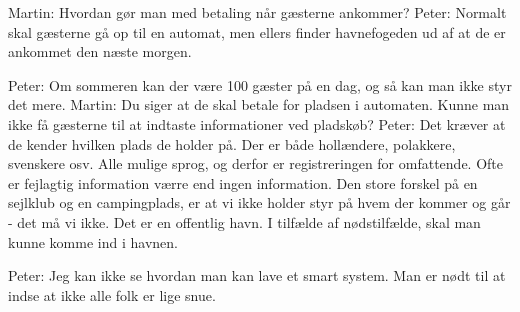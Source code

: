 \documentclass[a4paper]{article}
\begin{document}
Martin: Hvordan gør man med betaling når gæsterne ankommer?
Peter: Normalt skal gæsterne gå op til en automat, men ellers finder havnefogeden ud af at de er ankommet den næste morgen.

Peter: Om sommeren kan der være 100 gæster på en dag, og så kan man ikke styr det mere.
Martin: Du siger at de skal betale for pladsen i automaten. Kunne man ikke få gæsterne til at indtaste informationer ved pladskøb? 
Peter: Det kræver at de kender hvilken plads de holder på. Der er både hollændere, polakkere, svenskere osv. Alle mulige sprog, og derfor er registreringen for omfattende. Ofte er fejlagtig information værre end ingen information. Den store forskel på en sejlklub og en campingplads, er at vi ikke holder styr på hvem der kommer og går - det må vi ikke. Det er en offentlig havn. I tilfælde af nødstilfælde, skal man kunne komme ind i havnen.

Peter: Jeg kan ikke se hvordan man kan lave et smart system. Man er nødt til at indse at ikke alle folk er lige snue. 
\end{document}
